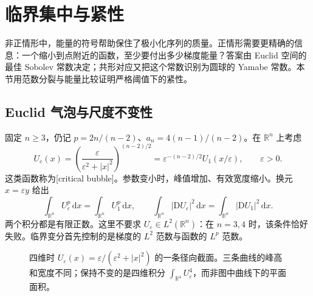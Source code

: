 
% 
% 

\section{临界集中与紧性}
\label{g3:sec:2404}

非正情形中，能量的符号帮助保住了极小化序列的质量。正情形需要更精确的信息：一个缩小到点附近的函数，至少要付出多少梯度能量？答案由 Euclid 空间的最佳 Sobolev 常数决定；共形对应又把这个常数识别为圆球的 Yamabe 常数。本节用范数分裂与能量比较证明严格阈值下的紧性。

\subsection{Euclid 气泡与尺度不变性}
\label{g3:subsec:2404:01}
固定 \(n\ge3\)，仍记 \(p=2n/(n-2)\)、\(a_n=4(n-1)/(n-2)\)。在 \(\mathbb R^n\) 上考虑
\begin{equation}\label{g3:eq:yamabe-euclidean-bubble}
	U_\varepsilon(x)=\left(\frac{\varepsilon}{\varepsilon^2+|x|^2}\right)^{(n-2)/2}
	=\varepsilon^{-(n-2)/2}U_1(x/\varepsilon),\qquad\varepsilon>0.
\end{equation}
这类函数称为[critical bubble]。参数变小时，峰值增加、有效宽度缩小。换元 \(x=\varepsilon y\) 给出
\[
	\int_{\mathbb R^n}U_\varepsilon^p\,\mathrm dx
	=\int_{\mathbb R^n}U_1^p\,\mathrm dx,
	\qquad
	\int_{\mathbb R^n}|\mathrm DU_\varepsilon|^2\,\mathrm dx
	=\int_{\mathbb R^n}|\mathrm DU_1|^2\,\mathrm dx.
\]
两个积分都是有限正数。这里不要求 \(U_\varepsilon\in L^2(\mathbb R^n)\)：在 \(n=3,4\) 时，该条件恰好失败。临界变分首先控制的是梯度的 \(L^2\) 范数与函数的 \(L^p\) 范数。

\begin{figure}[htbp]
	\centering
	
	\caption[临界气泡的尺度变化]{四维时 \(U_\varepsilon(x)=\varepsilon/(\varepsilon^2+|x|^2)\) 的一条径向截面。三条曲线的峰高和宽度不同；保持不变的是四维积分 \(\int_{\mathbb R^4}U_\varepsilon^4\)，而非图中曲线下的平面面积。}
	\label{g3:fig:yamabe-bubbles}
\end{figure}

